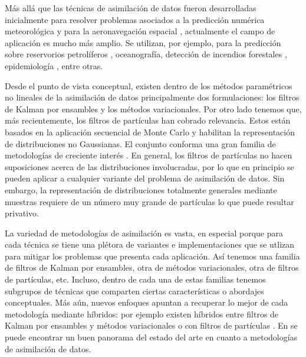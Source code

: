 Más allá que las técnicas de asimilación de datos fueron desarrolladas inicialmente para resolver problemas asociados a la predicción numérica meteorológica y para la aeronavegación espacial \citep{Grewal2010}, actualmente el campo de aplicación es mucho más amplio. Se utilizan, por ejemplo, para la predicción sobre reservorios petrolíferos \cite{Aanonsen2009}, oceanografía, detección de incendios forestales \citep{Mandel2008}, epidemiología \citep{Shaman2012}, entre otras.

Desde el punto de vista conceptual, existen dentro de los métodos paramétricos no lineales de la asimilación de datos principalmente dos formulaciones: los filtros de Kalman por ensambles y los métodos variacionales. Por otro lado tenemos que, más recientemente, los filtros de partículas han cobrado relevancia. Estos están basados en la aplicación secuencial de Monte Carlo y habilitan la representación de distribuciones no Gaussianas. El conjunto conforma una gran familia de metodologías de creciente interés \citep{vanLeeuwen2019}. En general, los filtros de partículas no hacen suposiciones acerca de las distribuciones involucradas, por lo que en principio se pueden aplicar a cualquier variante del problema de asimilación de datos. Sin embargo, la representación de distribuciones totalmente generales mediante muestras requiere de un número muy grande de partículas lo que puede resultar privativo.

La variedad de metodologías de asimilación es vasta, en especial porque para cada técnica se tiene una plétora de variantes e implementaciones que se utlizan para mitigar los problemas que presenta cada aplicación. Así tenemos una familia de filtros de Kalman por ensambles, otra de métodos variacionales, otra de filtros de partículas, etc. Incluso, dentro de cada una de estas familias tenemos subgrupos de técnicas que comparten ciertas características o abordajes conceptuales. Más aún, nuevos enfoques apuntan a recuperar lo mejor de cada metodología mediante híbridos: por ejemplo existen híbridos entre filtros de Kalman por ensambles y métodos variacionales \citep{Hamill2000} o con filtros de partículas \citep{Stordal2011, Frei2013}. En \cite{Carrassi2018} se puede encontrar un buen panorama del estado del arte en cuanto a metodologías de asimilación de datos.

